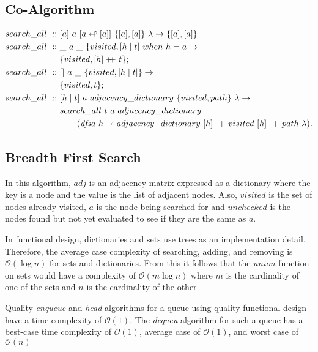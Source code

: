 \documentclass[a4paper,10pt]{book}
\newcommand\doubleplus{+\kern-1.3ex+\kern0.8ex}
\begin{document}
\subsection{Co-Algorithm}
\begin{align*}
search\_all\ ::\ &[a]\ a\ [a\looparrowleft [a]]\ \{[a],[a]\}\ \lambda\rightarrow\{[a],[a]\}\\
search\_all\ ::\ &\_\ a\ \_\ \{visited,[h\mid t]\ when\ h=a\rightarrow\\
	&\{visited,[h]\doubleplus t\};\\
search\_all\ ::\ &[]\ a\ \_\ \{visited,[h\mid t]\}\rightarrow\\
	&\{visited,t\};\\
search\_all\ ::\ &[h\mid t]\ a\ adjacency\_dictionary\ \{visited,path\}\ \lambda\rightarrow\\
	&search\_all\ t\ a\ adjacency\_dictionary\\
	&\qquad(\text{\textit{dfs}}a\ h\twoheadrightarrow adjacency\_dictionary\ [h]\doubleplus visited\ [h]\doubleplus path\ \lambda ). 
\end{align*}

\subsection{Breadth First Search}
In this algorithm, $adj$ is an adjacency matrix expressed as a dictionary where the key is a node and the value is the list of adjacent nodes. Also, $visited$ is the set of nodes already visited, $a$ is the node being searched for and $unchecked$ is the nodes found but not yet evaluated to see if they are the same as $a$.

In functional design, dictionaries and sets use trees as an implementation detail. Therefore, the average case complexity of searching, adding, and removing is $\mathcal{O}(\log n)$ for sets and dictionaries.  From this it follows that the $union$ function on sets would have a complexity of $\mathcal{O}(m \log n)$ where $m$ is the cardinality of one of the sets and $n$ is the cardinality of the other. 

Quality \textit{enqueue} and \textit{head} algorithms for a queue using quality functional design have a time complexity of $\mathcal{O}(1)$. The \textit{dequeu} algorithm for such a queue has a best-case time complexity of $\mathcal{O}(1)$, average case of $\mathcal{O}(1)$, and worst case of $\mathcal{O}(n)$
\end{document}
